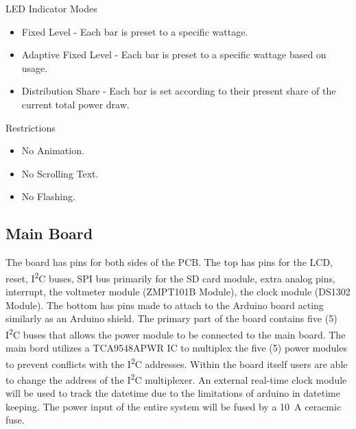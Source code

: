 \documentclass[conference, a4paper]{IEEEtran}
\begin{document}
LED Indicator Modes
\begin{itemize}
  \item Fixed Level - Each bar is preset to a specific wattage.
  \item Adaptive Fixed Level - Each bar is preset to a specific wattage based on usage.
  \item Distribution Share - Each bar is set according to their present share of the current
  total power draw.
\end{itemize}

Restrictions
\begin{itemize}
  \item No Animation.
  \item No Scrolling Text.
  \item No Flashing.
\end{itemize}

\subsection{Main Board}
\label{sec:main_board}

The board has pins for both sides of the PCB. The top has pins for the LCD, reset, I\textsuperscript{2}C buses, SPI bus primarily for the SD card module, extra analog pins,
interrupt, the voltmeter module (ZMPT101B Module), the clock module (DS1302 Module).
The bottom has pins made to attach to the Arduino board acting similarly as an Arduino shield.
The primary part of the board contains five (5) I\textsuperscript{2}C buses that allows the power module to be connected to the main board.
The main bord utilizes a TCA9548APWR IC to multiplex the five (5) power modules to prevent conflicts with the I\textsuperscript{2}C addresses.
Within the board itself users are able to change the address of the I\textsuperscript{2}C multiplexer.
An external real-time clock module will be used to track the datetime due to the limitations of arduino in datetime keeping.
The power input of the entire system will be fused by a \SI{10}{\ampere} ceracmic fuse.
\end{document}
